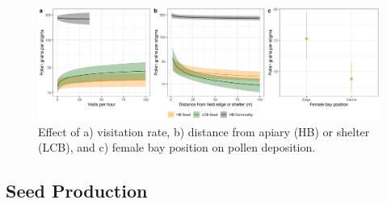 \documentclass[12pt]{article} %
\begin{document}
\begin{figure}
    \centering
    \includegraphics[width=\textwidth,keepaspectratio=true]{../Figures/allPollen.png}
    \caption{Effect of a) visitation rate, b) distance from apiary (HB) or shelter (LCB), and c) female bay position on pollen deposition.}
    \label{fig:allPollen}
\end{figure}


\subsection*{Seed Production}

\end{document}
